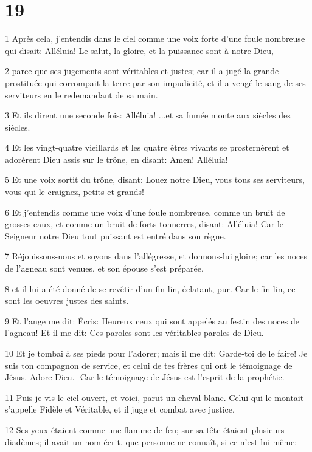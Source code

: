 \chapter{19}

\par 1 Après cela, j'entendis dans le ciel comme une voix forte d'une foule nombreuse qui disait: Alléluia! Le salut, la gloire, et la puissance sont à notre Dieu,
\par 2 parce que ses jugements sont véritables et justes; car il a jugé la grande prostituée qui corrompait la terre par son impudicité, et il a vengé le sang de ses serviteurs en le redemandant de sa main.
\par 3 Et ils dirent une seconde fois: Alléluia! ...et sa fumée monte aux siècles des siècles.
\par 4 Et les vingt-quatre vieillards et les quatre êtres vivants se prosternèrent et adorèrent Dieu assis sur le trône, en disant: Amen! Alléluia!
\par 5 Et une voix sortit du trône, disant: Louez notre Dieu, vous tous ses serviteurs, vous qui le craignez, petits et grands!
\par 6 Et j'entendis comme une voix d'une foule nombreuse, comme un bruit de grosses eaux, et comme un bruit de forts tonnerres, disant: Alléluia! Car le Seigneur notre Dieu tout puissant est entré dans son règne.
\par 7 Réjouissons-nous et soyons dans l'allégresse, et donnons-lui gloire; car les noces de l'agneau sont venues, et son épouse s'est préparée,
\par 8 et il lui a été donné de se revêtir d'un fin lin, éclatant, pur. Car le fin lin, ce sont les oeuvres justes des saints.
\par 9 Et l'ange me dit: Écris: Heureux ceux qui sont appelés au festin des noces de l'agneau! Et il me dit: Ces paroles sont les véritables paroles de Dieu.
\par 10 Et je tombai à ses pieds pour l'adorer; mais il me dit: Garde-toi de le faire! Je suis ton compagnon de service, et celui de tes frères qui ont le témoignage de Jésus. Adore Dieu. -Car le témoignage de Jésus est l'esprit de la prophétie.
\par 11 Puis je vis le ciel ouvert, et voici, parut un cheval blanc. Celui qui le montait s'appelle Fidèle et Véritable, et il juge et combat avec justice.
\par 12 Ses yeux étaient comme une flamme de feu; sur sa tête étaient plusieurs diadèmes; il avait un nom écrit, que personne ne connaît, si ce n'est lui-même;
